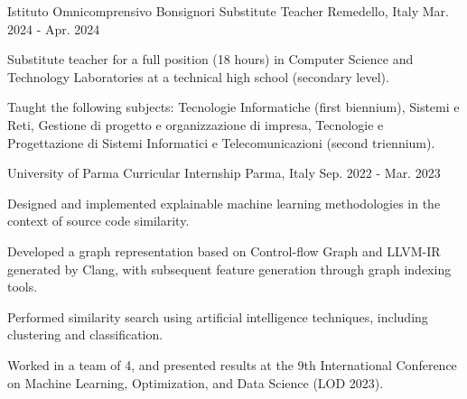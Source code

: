 \begin{cventries}

\cventry
    {Istituto Omnicomprensivo Bonsignori} %
    {Substitute Teacher} %
    {Remedello, Italy} %
    {Mar. 2024 - Apr. 2024} %
    {
        \begin{cvitems} %
            \item {Substitute teacher for a full position (18 hours) in Computer Science
            and Technology Laboratories at a technical high school (secondary level).}
            \item {Taught the following subjects: Tecnologie Informatiche (first biennium),
            Sistemi e Reti, Gestione di progetto e organizzazione di impresa,
            Tecnologie e Progettazione di Sistemi Informatici e Telecomunicazioni
            (second triennium).}
        \end{cvitems}
    }

\cventry
    {University of Parma} %
    {Curricular Internship} %
    {Parma, Italy} %
    {Sep. 2022 - Mar. 2023} %
    {
        \begin{cvitems} %
            \item {Designed and implemented explainable machine learning methodologies
            in the context of source code similarity.}
            \item {Developed a graph representation based on Control-flow Graph and
            LLVM-IR generated by Clang, with subsequent feature generation through
            graph indexing tools.}
            \item {Performed similarity search using artificial intelligence techniques,
            including clustering and classification.}
            \item {Worked in a team of 4, and presented results at the 9th International
            Conference on Machine Learning, Optimization, and Data Science (LOD 2023).}
        \end{cvitems}
    }


\end{cventries}
